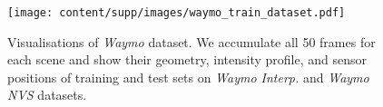 \begin{figure}[t]
\centering
\texttt{[image: content/supp/images/waymo\_train\_dataset.pdf]}

\caption{Visualisations of \textit{Waymo} dataset. We accumulate all 50 frames for each scene and show their geometry, intensity profile, and sensor positions of training and test sets on \textit{Waymo Interp.} and \textit{Waymo NVS} datasets.}
\label{fig:supp_waymo_dataset}

\end{figure}